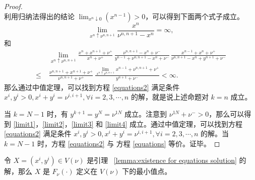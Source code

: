 \begin{proof}
\begin{equation}
    \end{equation}
    利用归纳法得出的结论 $\lim_{x^{n}\downarrow 0}(x^{n-1})>0$，可以得到下面两个式子成立。
    \begin{equation}\label{limit3}
        \lim_{x^{n}\uparrow \nu^{n,n+1}}\frac{x^{n}}{\nu^{n,n+1}-x^{n}}=\infty,
    \end{equation}
    和
    \begin{equation}\label{limit4}
        \begin{split}
            &\;\lim_{x^{n}\uparrow \nu^{n,n+1}}\frac{x^{n}+x^{n+1}+\nu^+}{x^{n}+\nu^+}\,\frac{\nu^{n,n+1}-x^{n}+\nu^-}{y^{n-1}+\nu^{n,n+1}-x^{n}+\nu^-}\,\frac{x^{n-1}+x^{n}+\nu^+}{\nu^{n,n+1}-x^{n}+y^{n+1}+\nu^-}\\
            \le &\;\frac{\nu^{n,n+1}+x^{n+1}+\nu^+}{\nu^{n,n+1}+\nu^+}\,\frac{\lim_{x^{n}\uparrow \nu^{n,n+1}}x^{n-1}+\nu^{n,n+1}+\nu^+}{y^{n+1}+\nu^-}<\infty.
        \end{split}
    \end{equation}
    那么通过中值定理，可以找到方程 \eqref{equations2} 满足条件 $x^{i},y^i>0, x^{i}+y^{i}=\nu^{i,i+1}, \forall i=2,3, \cdots, n$ 的解，就是说上述命题对 $k=n$ 成立。

    当 $k=N-1$ 时，有 $y^{k+1}=y^N=\nu^{1N}$ 成立。注意到 $\nu^{1N}+\nu^->0$，那么可以得到 \eqref{limit1}，\eqref{limit2}，\eqref{limit3} 和 \eqref{limit4} 成立。通过中值定理，可以找到方程 \eqref{equations2} 满足条件 $x^{i},y^i>0, x^{i}+y^{i}=\nu^{i,i+1}, \forall i=2,3, \cdots, n$ 的解。当 $k=N-1$ 时，方程 \eqref{equations2} 与 方程 \eqref{equations} 等价。证毕。

\end{proof}
\begin{lemma}\label{lemma:mininum}
    令 $X=(x^i,y^i)\in V(\nu)$ 是引理 ~\ref{lemma:existence for equations solution} 的解，那么 $X$ 是 $F_{\nu}(\cdot)$ 定义在 $V(\nu)$ 下的最小值点。 
\end{lemma}
